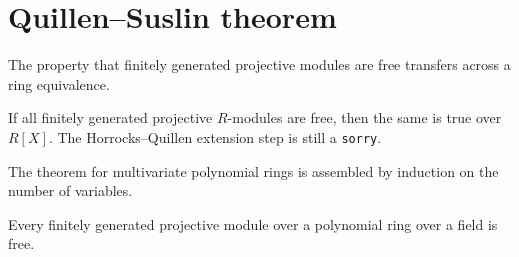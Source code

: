 \section{Quillen--Suslin theorem}

\begin{definition}
\label{def:qs-transfer}
\leanok
The property that finitely generated projective modules are free transfers across a ring equivalence.
\end{definition}

\begin{theorem}
\label{thm:qs-step}
\notready
If all finitely generated projective $R$-modules are free, then the same is true over $R[X]$. The Horrocks--Quillen extension step is still a \texttt{sorry}.
\end{theorem}

\begin{definition}
\label{def:qs-forall}
\notready
{}
The theorem for multivariate polynomial rings is assembled by induction on the number of variables.
\end{definition}

\begin{theorem}
\label{thm:quillen-suslin}
\notready
{}
Every finitely generated projective module over a polynomial ring over a field is free.
\end{theorem}
